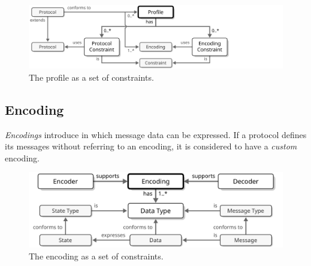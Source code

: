 \begin{figure}[ht!]
  \centering
  \includegraphics[scale=0.9]{figures/profile}
  \caption{
    The profile as a set of constraints.
  }
  \label{fig:profile}
\end{figure}

\subsection{Encoding}
\label{sec:concepts:encoding}

\textit{Encodings} introduce  in which message data can be expressed.
If a protocol defines its messages without referring to an encoding, it is considered to have a \textit{custom} encoding.

\begin{figure}[ht!]
  \centering
  \includegraphics[scale=0.9]{figures/encoding}
  \caption{
    The encoding as a set of constraints.
  }
  \label{fig:encoding}
\end{figure}